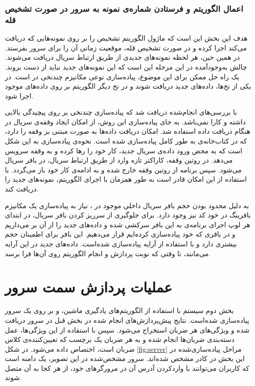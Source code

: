 \subsubsection{اعمال الگوریتم و فرستادن شماره‌ی نمونه به  سرور
 در صورت تشخیص قله}
	 هدف این بخش این است که  ماژول  الگوریتم تشخیص  را بر روی نمونه‌هایی که دریافت می‌کند اجرا کرده و در صورت تشخیص قله، موقعیت زمانی آن را برای سرور بفرستد. در همین حین، هر لحظه نمونه‌های جدیدی از طریق ارتباط سریال دریافت می‌شوند. چالش به‌وجودآمده در این مرحله این است که این نمونه‌های جدید نباید از دست بروند. یک راه حل ممکن برای این موضوع،‌ پیاده‌سازی نوعی مکانیزم چندنخی در  است. در یکی از نخ‌ها، داده‌های جدید دریافت شوند و در نخ دیگر الگوریتم بر روی داده‌‌های موجود اجرا شود.
	 
با بررسی‌های انجام‌شده دریافت شد که پیاده‌سازی چندنخی بر روی  پیچیدگی بالایی داشته و کارا نمی‌باشد. به جای پیاده‌سازی این روش، از امکان ایجاد وقفه‌ی سریال در هنگام دریافت داده استفاده شد.  امکان دریافت داده‌ها به صورت مبتنی بر وقفه را دارد، که در کتاب‌خانه‌ی  به طور کامل پیاده‌سازی شده است. نحوه‌ی پیاده‌سازی به این شکل است که به محض ورود داده‌ی سریال جدید،  کار خود را رها کرده و به وقفه سرویس می‌دهد. در روتین وقفه، کاراکتر تازه وارد از طریق ارتباط سریال، در بافر سریال  می‌شود. سپس برنامه از روتین وقفه خارج شده و به ادامه‌ی کار خود باز می‌گردد. با استفاده از این امکان  قادر است به طور همزمان با اجرای الگوریتم، نمونه‌های جدید را دریافت کند.

 به دلیل محدود بودن حجم بافر سریال داخلی موجود در ، نیاز به پیاده‌سازی یک مکانیزم بافرینگ در خود کد نیز وجود دارد. برای جلوگیری از سرریز کردن بافر سریال، در ابتدای هر لوپ اجرای برنامه‌ی  به این بافر سرکشی شده و داده‌های جدید را از آن بر می‌داریم و در بافری که خود پیاده‌سازی کرده‌ایم قرار می‌دهیم. این بافر برای اطمینان حجم بیشتری دارد و با استفاده از آرایه پیاده‌سازی شده‌است. داده‌های جدید در این آرایه می‌مانند، تا وقتی که نوبت پردازش و انجام الگوریتم روی آن‌ها فرا برسد.

	

\section{عملیات پردازش سمت سرور}
بخش دوم سیستم با استفاده از الگوریتم‌های یادگیری ماشین، و بر روی یک سرور پیاده‌سازی شده‌است. نتایج پیش‌پردازش‌های انجام شده در بخش قبل در سرور دریافت شده و ویژگی‌های هر ضربان استخراج می‌شود. سپس با استفاده از این ویژگی‌ها، عمل دسته‌بندی ضربان‌ها انجام شده و به هر ضربان یک برچسب که تعیین‌کننده‌ی کلاس ضربان است، اختصاص داده می‌شود. در شکل \ref{fig:server} مراحل پیاده‌سازی‌شده در این بخش در کادر مشخص شده‌اند. سرور مشخص‌شده در این تصویر، یک دامنه است که کاربران می‌توانند با واردکردن آدرس آن در مرورگرهای خود، از هر کجا به آن متصل شوند.

